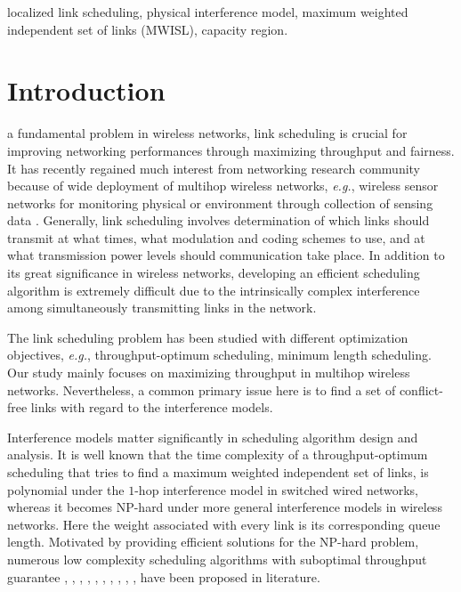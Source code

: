 \documentclass[journal]{IEEEtran}
\begin{document}
\begin{IEEEkeywords}
localized link scheduling, physical interference model, maximum weighted independent set of links (MWISL), capacity region.
\end{IEEEkeywords}

\IEEEpeerreviewmaketitle

\section{Introduction}

 a fundamental problem in wireless networks, link scheduling is crucial for improving  networking performances through maximizing throughput and fairness. It has recently regained much interest from networking research community because of wide deployment of multihop wireless networks, \emph{e.g.}, wireless sensor networks for monitoring physical or environment \cite{li2009underground} \cite{liu2010passive} through collection of sensing data \cite{S:effcient}.
Generally, link scheduling involves determination of which links should transmit at what times, what modulation and coding schemes to use, and at what transmission power levels should communication take place\cite{S:GMS}. In addition to its great significance in wireless networks, developing an efficient scheduling algorithm is extremely difficult due to the intrinsically complex interference among simultaneously transmitting links in the network.

The link scheduling problem has been studied with different optimization objectives, \emph{e.g.}, throughput-optimum scheduling, minimum length scheduling. Our study mainly focuses on maximizing throughput in multihop wireless networks. Nevertheless,  a common primary issue here is to find a set of conflict-free links with regard to the interference models.

Interference models matter significantly in scheduling algorithm design and analysis. It is well known that the time complexity of a throughput-optimum scheduling that tries to find a maximum weighted independent set of links, is polynomial under the $1$-hop interference model in switched wired networks, whereas it becomes NP-hard under more general interference models in wireless networks\cite{S:GMS}. Here the weight associated with every link is its corresponding queue length. Motivated by providing efficient solutions for the NP-hard problem, numerous low complexity scheduling algorithms with suboptimal throughput guarantee \cite{S:MWM2}, \cite{S:GMS}, \cite{S:constant1}, \cite{S:constant2}, \cite{S:constant3}, \cite{S:constant4}, \cite{S:pick1}, \cite{S:pick2}, \cite{S:pick3}, \cite{S:MS}, have been proposed in literature.
\end{document}
